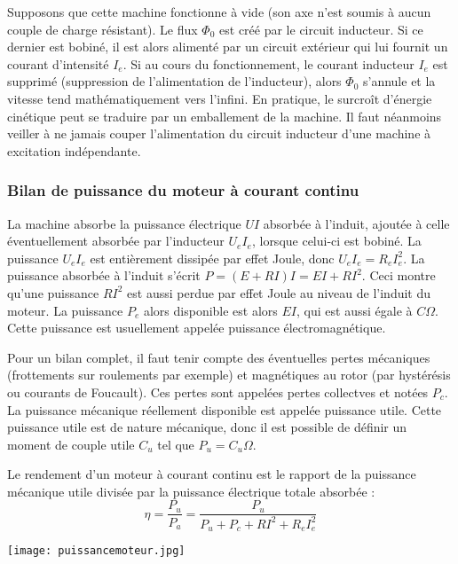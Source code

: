 \documentclass{article}
\begin{document}
Supposons que cette machine fonctionne à vide (son axe n'est soumis à aucun couple de charge résistant). Le flux $\Phi_0$ est créé par le circuit inducteur. Si ce dernier est bobiné, il est alors alimenté par un circuit extérieur qui lui fournit un courant d'intensité $I_e$. Si au cours du fonctionnement, le courant inducteur $I_e$ est supprimé (suppression de l'alimentation de l'inducteur), alors $\Phi_0$ s'annule et la vitesse tend mathématiquement vers l'infini. En pratique, le surcroît d'énergie cinétique peut se traduire par un emballement de la machine. Il faut néanmoins veiller à ne jamais couper l'alimentation du circuit inducteur d'une machine à excitation indépendante. 

\subsubsection{Bilan de puissance du moteur à courant continu}

La machine absorbe la puissance électrique $UI$ absorbée à l'induit, ajoutée à celle éventuellement absorbée par l'inducteur $U_e I_e$, lorsque celui-ci est bobiné. La puissance $U_e I_e$ est entièrement dissipée par effet Joule, donc $U_e I_e = R_e I_e^2$.
\medskip
La puissance absorbée à l'induit s'écrit $P = (E + RI)I = EI + RI^2$. Ceci montre qu'une puissance $RI^2$ est aussi perdue par effet Joule au niveau de l'induit du moteur. La puissance $P_e$ alors disponible est alors $EI$, qui est aussi égale à $C\Omega$. Cette puissance est usuellement appelée puissance électromagnétique.\medskip

Pour un bilan complet, il faut tenir compte des éventuelles pertes mécaniques (frottements sur roulements par exemple) et magnétiques au rotor (par hystérésis ou courants de Foucault). Ces pertes sont appelées pertes collectves et notées $P_c$. La puissance mécanique réellement disponible est appelée puissance utile. Cette puissance utile est de nature mécanique, donc il est possible de définir un moment de couple utile $C_u$ tel que $P_u = C_u \Omega$.\medskip

Le rendement d'un moteur à courant continu est le rapport de la puissance mécanique utile divisée par la puissance électrique totale absorbée : 
\begin{equation}
    \eta = \frac{P_u}{P_a} = \frac{P_u}{P_u + P_c + RI^2 + R_e I_e^2}
\end{equation}

\medskip

\begin{center}
    \texttt{[image: puissancemoteur.jpg]}
\end{center}
\end{document}
